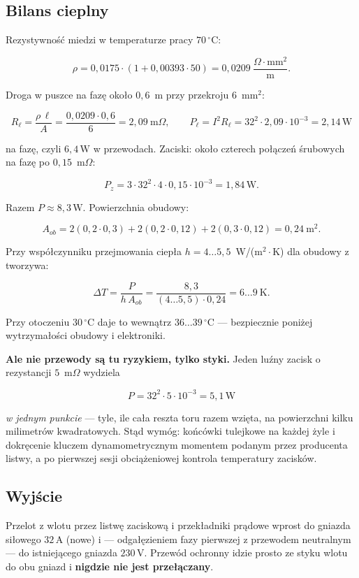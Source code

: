 \documentclass[a4paper,11pt]{article}
\newcommand{\volt}{\,\mathrm{V}}
\newcommand{\amp}{\,\mathrm{A}}
\newcommand{\watt}{\,\mathrm{W}}
\begin{document}
\subsection{Bilans cieplny}

Rezystywność miedzi w temperaturze pracy $70\,^\circ$C:

\[
\rho = 0{,}0175\cdot\left(1+0{,}00393\cdot50\right)
     = 0{,}0209\ \frac{\Omega\cdot\mathrm{mm}^2}{\mathrm{m}} .
\]

Droga w puszce na fazę około $0{,}6$~m przy przekroju $6$~mm$^2$:

\[
R_{\ell}=\frac{\rho\,\ell}{A}=\frac{0{,}0209\cdot0{,}6}{6}=2{,}09\ \mathrm{m}\Omega,
\qquad
P_{\ell}=I^2R_{\ell}=32^2\cdot2{,}09\cdot10^{-3}=2{,}14\watt
\]

na fazę, czyli $6{,}4\watt$ w przewodach. Zaciski: około czterech połączeń
śrubowych na fazę po $0{,}15$~m$\Omega$:

\[
P_{z}=3\cdot32^2\cdot4\cdot0{,}15\cdot10^{-3}=1{,}84\watt .
\]

Razem $P\approx 8{,}3\watt$. Powierzchnia obudowy:

\[
A_{ob}=2(0{,}2\cdot0{,}3)+2(0{,}2\cdot0{,}12)+2(0{,}3\cdot0{,}12)=0{,}24\ \mathrm{m}^2 .
\]

Przy współczynniku przejmowania ciepła $h=4\ldots5{,}5$~W/(m$^2\cdot$K) dla obudowy
z tworzywa:

\[
\Delta T=\frac{P}{h\,A_{ob}}=\frac{8{,}3}{(4\ldots5{,}5)\cdot0{,}24}=6\ldots9\ \mathrm{K}.
\]

Przy otoczeniu $30\,^\circ$C daje to wewnątrz $36\ldots39\,^\circ$C --- bezpiecznie
poniżej wytrzymałości obudowy i elektroniki.

\textbf{Ale nie przewody są tu ryzykiem, tylko styki.} Jeden luźny zacisk
o rezystancji $5$~m$\Omega$ wydziela

\[
P = 32^2\cdot5\cdot10^{-3}=5{,}1\watt
\]

\emph{w jednym punkcie} --- tyle, ile cała reszta toru razem wzięta, na powierzchni
kilku milimetrów kwadratowych. Stąd wymóg: końcówki tulejkowe na każdej żyle
i dokręcenie kluczem dynamometrycznym momentem podanym przez producenta listwy,
a po pierwszej sesji obciążeniowej kontrola temperatury zacisków.

\subsection{Wyjście}

Przelot z wlotu przez listwę zaciskową i przekładniki prądowe wprost do gniazda
siłowego $32\amp$ (nowe) i --- odgałęzieniem fazy pierwszej z przewodem
neutralnym --- do istniejącego gniazda $230\volt$. Przewód ochronny idzie prosto
ze styku wlotu do obu gniazd i \textbf{nigdzie nie jest przełączany}.
\end{document}
